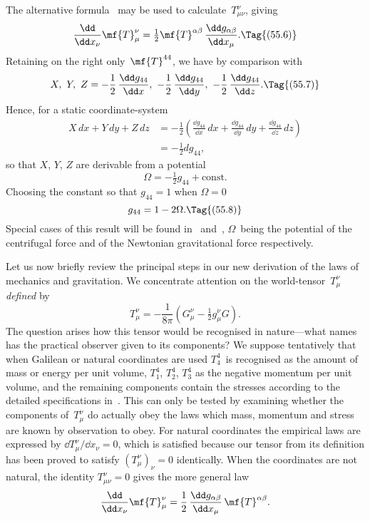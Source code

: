 \documentclass[12pt]{book}
\begin{document}
The alternative formula~ may be used to calculate~$T_{\mu\nu}^{\nu}$, giving
\[
\frac{\dd}{\dd x_{\nu}} \mf{T}_{\mu}^{\nu}
= \tfrac{1}{2} \mf{T}^{\alpha\beta}\, \frac{\dd g_{\alpha\beta}}{\dd x_{\mu}}.
\Tag{(55.6)}
\]
Retaining on the right only~$\mf{T}^{44}$, we have by comparison with~
\[
X,\ Y,\ Z = -\frac{1}{2}\, \frac{\dd g_{44}}{\dd x},\
-\frac{1}{2}\, \frac{\dd g_{44}}{\dd y},\
-\frac{1}{2}\, \frac{\dd g_{44}}{\dd z}.
\Tag{(55.7)}
\]
Hence, for a static coordinate\hyp{}system
\begin{align*}
  X\, dx + Y\, dy + Z\, dz
  &= -\frac{1}{2}\left(\frac{\dd g_{44}}{\dd x}\, dx + \frac{\dd g_{44}}{\dd y}\, dy + \frac{\dd g_{44}}{\dd z}\, dz\right) \\
  &= -\tfrac{1}{2} dg_{44},
\end{align*}
so that $X$, $Y$, $Z$ are derivable from a potential
%
\[
\Omega = -\tfrac{1}{2} g_{44} + \text{const.}
\]
Choosing the constant so that $g_{44} = 1$ when $\Omega = 0$
\[
g_{44} = 1 - 2\Omega.
\Tag{(55.8)}
\]
Special cases of this result will be found in~ and~, $\Omega$~being the
potential of the centrifugal force and of the Newtonian gravitational force
respectively.

Let us now briefly review the principal steps in our new derivation of the
laws of mechanics and gravitation. We concentrate attention on the world\hyp{}tensor~$T_{\mu}^{\nu}$
\emph{defined} by
\[
T_{\mu}^{\nu} = -\frac{1}{8\pi} (G_{\mu}^{\nu} - \tfrac{1}{2} g_{\mu}^{\nu} G).
\]
The question arises how this tensor would be recognised in nature---what
names has the practical observer given to its components? We suppose
tentatively that when Galilean or natural coordinates are used $T_{4}^{4}$~is recognised
as the amount of mass or energy per unit volume, $T_{1}^{4}$, $T_{2}^{4}$, $T_{3}^{4}$ as the negative
momentum per unit volume, and the remaining components contain the
stresses according to the detailed specifications in~\Eq{(53.91)}. This can only be
tested by examining whether the components of~$T_{\mu}^{\nu}$ do actually obey the laws
which mass, momentum and stress are known by observation to obey. For
natural coordinates the empirical laws are expressed by $\dd T_{\mu}^{\nu}/\dd x_{\nu} = 0$, which is
satisfied because our tensor from its definition has been proved to satisfy
$(T_{\mu}^{\nu})_{\nu} = 0$ identically. When the coordinates are not natural, the identity
$T_{\mu\nu}^{\nu} = 0$ gives the more general law
\[
\frac{\dd}{\dd x_{\nu}} \mf{T}_{\mu}^{\nu}
= \frac{1}{2}\, \frac{\dd g_{\alpha\beta}}{\dd x_{\mu}}\, \mf{T}^{\alpha\beta}.
\]
\end{document}
